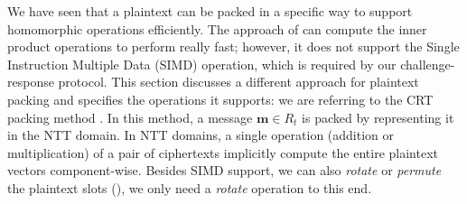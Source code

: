 We have seen that a plaintext can be packed in a specific way to support
homomorphic operations efficiently. The approach of \cite{yasuda2014practical}
can compute the inner product operations to perform really fast; however, it
does not support the Single Instruction Multiple Data (SIMD) operation, which is
required by our challenge-response protocol. This section discusses a different
approach for plaintext packing and specifies the operations it supports: we are
referring to the CRT packing method \cite{smart2014fully}. In this method, a
message \(\mathbf{m} \in R_{t}\) is packed by representing it in the NTT
domain. In NTT domains, a single operation (addition or multiplication) of a
pair of ciphertexts implicitly compute the entire plaintext vectors
component-wise. Besides SIMD support, we can also \textit{rotate} or
\textit{permute} the plaintext slots (\cite{gentry2012fully}), we only need a
\textit{rotate} operation to this end.


